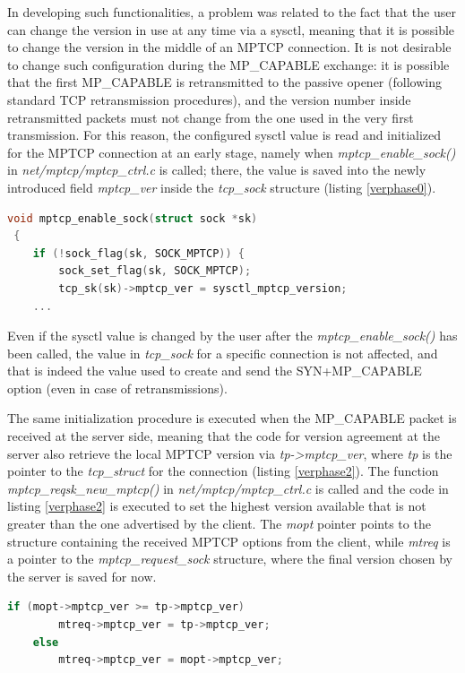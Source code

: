 In developing such functionalities, a problem was related to the fact that the user can change the version in use at any time via a sysctl, meaning that it is possible to change the version in the middle of an MPTCP connection. It is not desirable to change such configuration during the MP\_CAPABLE exchange: it is possible that the first MP\_CAPABLE is retransmitted to the passive opener (following standard TCP retransmission procedures), and the version number inside retransmitted packets must not change from the one used in the very first transmission. For this reason, the configured sysctl value is read and initialized for the MPTCP connection at an early stage, namely when \textit{mptcp\_enable\_sock()} in \textit{net/mptcp/mptcp\_ctrl.c} is called; there, the value is saved into the newly introduced field \textit{mptcp\_ver} inside the \textit{tcp\_sock} structure (listing \ref{verphase0}).

\begin{lstlisting}[language=c, caption=\textit{MPTCP version agreement, initializing sysctl value}, label=verphase0]
 void mptcp_enable_sock(struct sock *sk)
 {
 	if (!sock_flag(sk, SOCK_MPTCP)) {
 		sock_set_flag(sk, SOCK_MPTCP);
		tcp_sk(sk)->mptcp_ver = sysctl_mptcp_version;
	...
\end{lstlisting}

Even if the sysctl value is changed by the user after the \textit{mptcp\_enable\_sock()} has been called, the value in \textit{tcp\_sock} for a specific connection is not affected, and that is indeed the value used to create and send the SYN+MP\_CAPABLE option (even in case of retransmissions). 


The same initialization procedure is executed when the MP\_CAPABLE packet is received at the server side, meaning that the code for version agreement at the server also retrieve the local MPTCP version via \textit{tp->mptcp\_ver}, where \textit{tp} is the pointer to the \textit{tcp\_struct} for the connection (listing \ref{verphase2}). The function \textit{mptcp\_reqsk\_new\_mptcp()} in \textit{net/mptcp/mptcp\_ctrl.c} is called and the code in listing \ref{verphase2} is executed to set the highest version available that is not greater than the one advertised by the client. The \textit{mopt} pointer points to the structure containing the received MPTCP options from the client, while \textit{mtreq} is a pointer to the \textit{mptcp\_request\_sock} structure, where the final version chosen by the server is saved for now.

\begin{lstlisting}[language=c, caption=\textit{MPTCP version agreement, phase 2}, label=verphase2]
	if (mopt->mptcp_ver >= tp->mptcp_ver)
		mtreq->mptcp_ver = tp->mptcp_ver;
	else
		mtreq->mptcp_ver = mopt->mptcp_ver;
\end{lstlisting}

